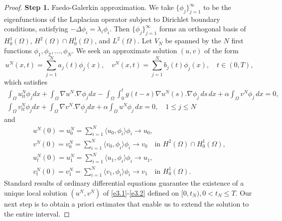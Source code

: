 \documentclass[10pt,a4paper]{amsart}
\numberwithin{equation}{section}
\begin{document}
\begin{proof} \quad

\noindent\textbf{Step 1.} Faedo-Galerkin approximation.
We take
\(\{ \phi_j \}_{j=1}^\infty\)
to be the eigenfunctions of the Laplacian operator subject to Dirichlet boundary conditions, satisfying $-\Delta \phi_i = \lambda_i \phi_i $. Then
$\{\phi_j\}_{j=1}^\infty$ forms an orthogonal basis of $ H_0^1(\Omega)$,
\( H^2(\Omega) \cap H_0^1(\Omega) \), and \( L^2(\Omega) \).
Let $V_{N}$ be spanned by the $N$ first functions $ \phi_1, \phi_2, \dots, \phi_N $.
We seek  an approximate solution $(u,v)$ of the form
\[
u^N(x,t) = \sum_{j=1}^N a_j(t) \phi_j(x), \quad
v^N(x,t) = \sum_{j=1}^N b_j(t) \phi_j(x), \quad t\in (0,T),
\]
which satisfies
\begin{gather*}
\int_\Omega u_{tt}^N \phi_j dx + \int_\Omega \nabla u^N .\nabla \phi_j dx - \int_\Omega \int_0^t g(t-s) \nabla u^N(s) .\nabla \phi_j\, ds\,dx+ \alpha \int_\Omega v^N \phi_j \, dx = 0,\\
\int_\Omega v_{tt}^N \phi_j dx + \int_\Omega \nabla v^N .\nabla \phi_j dx+ \alpha \int_\Omega u^N \phi_j \, dx = 0,\quad 1\leq j\leq N
\label{e3.1}
\end{gather*}
and
\begin{equation} \label{e3.2}
\begin{gathered}
 u^{N}(0) = u^{N}_0= \sum_{i=1}^{N} \langle u_0, \phi_i \rangle \phi_i
 \to u_0, \\
  v^{N}(0) = v^{N}_0 = \sum_{i=1}^{N} \langle v_0, \phi_i \rangle \phi_i
 \to v_0 \quad \text{in } H^2(\Omega) \cap H_0^1(\Omega), \\
 u_{t}^N(0) = u_1^N = \sum_{i=1}^{N} \langle u_1, \phi_i \rangle \phi_i \to u_{1}, \\
 v_{t}^N(0) = v_1^N = \sum_{i=1}^{N} \langle v_1, \phi_i \rangle \phi_i \to v_{1} \quad \text{in } H^1_0(\Omega).
 \end{gathered}
\end{equation}
Standard results of ordinary differential equations guarantee the existence of
a unique local solution
$ (u^N, v^N )$ of \eqref{e3.1}-\eqref{e3.2} defined on
$ [0, t_{N}), 0 < t_{N} \leq T $.
Our next step is to obtain a priori estimates that enable us to extend the
solution to the entire interval.
\smallskip


\end{proof}
\end{document}
